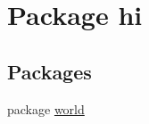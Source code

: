 \hypertarget{namespacehi}{}\section{Package hi}
\label{namespacehi}
\subsection*{Packages}
\begin{DoxyCompactItemize}
\item 
package \mbox{\hyperlink{namespacehi_1_1world}{world}}
\end{DoxyCompactItemize}
